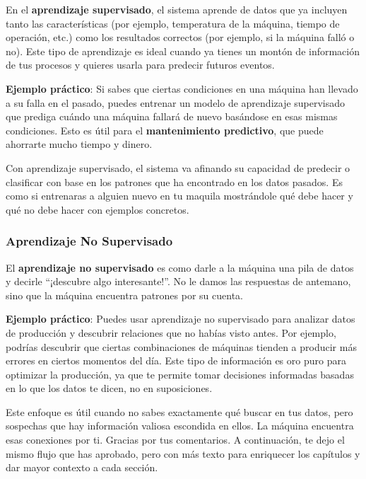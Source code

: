 \documentclass[
  10pt,
  letterpaper,
]{book}
\begin{document}
En el \textbf{aprendizaje supervisado}, el sistema aprende de datos que
ya incluyen tanto las características (por ejemplo, temperatura de la
máquina, tiempo de operación, etc.) como los resultados correctos (por
ejemplo, si la máquina falló o no). Este tipo de aprendizaje es ideal
cuando ya tienes un montón de información de tus procesos y quieres
usarla para predecir futuros eventos.

\textbf{Ejemplo práctico}: Si sabes que ciertas condiciones en una
máquina han llevado a su falla en el pasado, puedes entrenar un modelo
de aprendizaje supervisado que prediga cuándo una máquina fallará de
nuevo basándose en esas mismas condiciones. Esto es útil para el
\textbf{mantenimiento predictivo}, que puede ahorrarte mucho tiempo y
dinero.

Con aprendizaje supervisado, el sistema va afinando su capacidad de
predecir o clasificar con base en los patrones que ha encontrado en los
datos pasados. Es como si entrenaras a alguien nuevo en tu maquila
mostrándole qué debe hacer y qué no debe hacer con ejemplos concretos.

\subsubsection{\texorpdfstring{\textbf{Aprendizaje No
Supervisado}}{Aprendizaje No Supervisado}}\label{aprendizaje-no-supervisado-1}

El \textbf{aprendizaje no supervisado} es como darle a la máquina una
pila de datos y decirle ``¡descubre algo interesante!''. No le damos las
respuestas de antemano, sino que la máquina encuentra patrones por su
cuenta.

\textbf{Ejemplo práctico}: Puedes usar aprendizaje no supervisado para
analizar datos de producción y descubrir relaciones que no habías visto
antes. Por ejemplo, podrías descubrir que ciertas combinaciones de
máquinas tienden a producir más errores en ciertos momentos del día.
Este tipo de información es oro puro para optimizar la producción, ya
que te permite tomar decisiones informadas basadas en lo que los datos
te dicen, no en suposiciones.

Este enfoque es útil cuando no sabes exactamente qué buscar en tus
datos, pero sospechas que hay información valiosa escondida en ellos. La
máquina encuentra esas conexiones por ti. Gracias por tus comentarios. A
continuación, te dejo el mismo flujo que has aprobado, pero con más
texto para enriquecer los capítulos y dar mayor contexto a cada sección.
\end{document}
